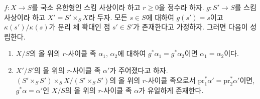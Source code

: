 \begin{lemma}
\label{lemma-descend-family}
$f : X \to S$를 국소 유한형인 스킴 사상이라 하고 $r \geq 0$을
정수라 하자. $g : S' \to S$를 스킴 사상이라 하고
$X' = S' \times_S X$라 두자. 모든 $s \in S$에 대하여
$g(s') = s$이고 $\kappa(s')/\kappa(s)$가 분리 체 확대인 점
$s' \in S'$가 존재한다고 가정하자. 그러면 다음이 성립한다.
\begin{enumerate}
\item $X/S$의 올 위의 $r$-사이클 족 $\alpha_1$, $\alpha_2$에 대하여
$g^*\alpha_1 = g^*\alpha_2$이면 $\alpha_1 = \alpha_2$이다.
\item $X'/S'$의 올 위의 $r$-사이클 족 $\alpha'$가 주어졌다고 하자.
$(S' \times_S S') \times_S X / (S' \times_S S')$의 올 위의
$r$-사이클 족으로서
$\text{pr}_1^*\alpha' = \text{pr}_2^*\alpha'$이면,
$g^*\alpha = \alpha'$인 $X/S$의 올 위의 $r$-사이클 족
$\alpha$가 유일하게 존재한다.
\end{enumerate}
\end{lemma}

